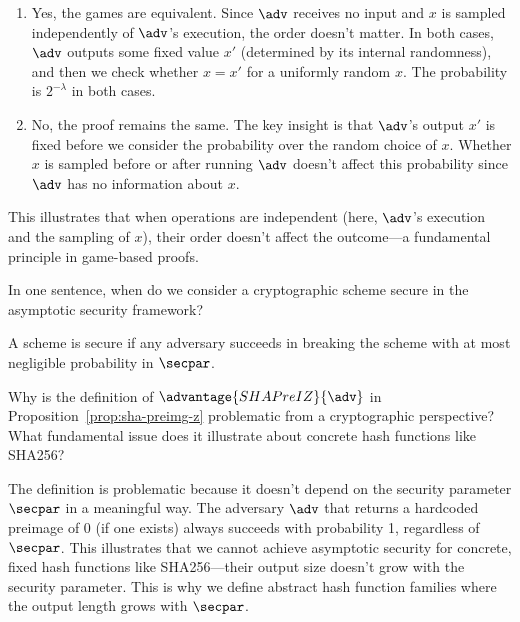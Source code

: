 \ifsolutions
\begin{mysolution}
  \begin{enumerate}
    \item Yes, the games are equivalent.
    Since $\adv$ receives no input and $x$ is sampled independently of $\adv$'s execution, the order doesn't matter.
    In both cases, $\adv$ outputs some fixed value $x'$ (determined by its internal randomness), and then we check whether $x = x'$ for a uniformly random $x$.
    The probability is $2^{-\lambda}$ in both cases.
    
    \item No, the proof remains the same.
    The key insight is that $\adv$'s output $x'$ is fixed before we consider the probability over the random choice of $x$.
    Whether $x$ is sampled before or after running $\adv$ doesn't affect this probability since $\adv$ has no information about $x$.
  \end{enumerate}
  
  This illustrates that when operations are independent (here, $\adv$'s execution and the sampling of $x$), their order doesn't affect the outcome—a fundamental principle in game-based proofs.
\end{mysolution}
\fi

\begin{exercise}\label{ex:asymptotic-security}
  In one sentence, when do we consider a cryptographic scheme secure in the asymptotic security framework?
\end{exercise}

\ifsolutions
\begin{mysolution}
  A scheme is secure if any \ppt adversary succeeds in breaking the scheme with at most negligible probability in $\secpar$.
\end{mysolution}
\fi

\begin{exercise}\label{ex:sha-preimage-problem}
  Why is the definition of $\advantage{SHAPreIZ}{\adv}$ in Proposition~\ref{prop:sha-preimg-z} problematic from a cryptographic perspective?
  What fundamental issue does it illustrate about concrete hash functions like SHA256?
\end{exercise}

\ifsolutions
\begin{mysolution}
  The definition is problematic because it doesn't depend on the security parameter $\secpar$ in a meaningful way.
  The adversary $\adv$ that returns a hardcoded preimage of 0 (if one exists) always succeeds with probability 1, regardless of $\secpar$.
  This illustrates that we cannot achieve asymptotic security for concrete, fixed hash functions like SHA256—their output size doesn't grow with the security parameter.
  This is why we define abstract hash function families where the output length grows with $\secpar$.
\end{mysolution}
\fi

